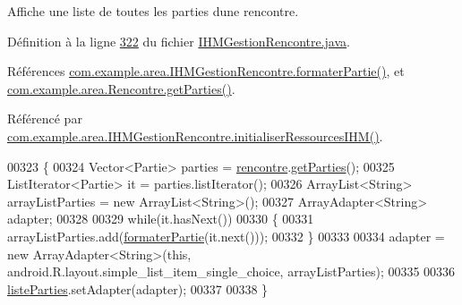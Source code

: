 Affiche une liste de toutes les parties d\textquotesingle{}une rencontre. 



Définition à la ligne \hyperlink{_i_h_m_gestion_rencontre_8java_source_l00322}{322} du fichier \hyperlink{_i_h_m_gestion_rencontre_8java_source}{I\+H\+M\+Gestion\+Rencontre.\+java}.



Références \hyperlink{_i_h_m_gestion_rencontre_8java_source_l00343}{com.\+example.\+area.\+I\+H\+M\+Gestion\+Rencontre.\+formater\+Partie()}, et \hyperlink{_rencontre_8java_source_l00158}{com.\+example.\+area.\+Rencontre.\+get\+Parties()}.



Référencé par \hyperlink{_i_h_m_gestion_rencontre_8java_source_l00142}{com.\+example.\+area.\+I\+H\+M\+Gestion\+Rencontre.\+initialiser\+Ressources\+I\+H\+M()}.


\begin{DoxyCode}
00323     \{
00324         Vector<Partie> parties = \hyperlink{classcom_1_1example_1_1area_1_1_i_h_m_gestion_rencontre_aa3ecacbd8ab104d2a3c3f3e727ae6c5c}{rencontre}.\hyperlink{classcom_1_1example_1_1area_1_1_rencontre_a58b62bd2f8a63f532df2bc8607268a2d}{getParties}();
00325         ListIterator<Partie> it = parties.listIterator();
00326         ArrayList<String> arrayListParties = \textcolor{keyword}{new} ArrayList<String>();
00327         ArrayAdapter<String> adapter;
00328 
00329         \textcolor{keywordflow}{while}(it.hasNext())
00330         \{
00331             arrayListParties.add(\hyperlink{classcom_1_1example_1_1area_1_1_i_h_m_gestion_rencontre_aadc556a63bb77b707f4677c34d61dae5}{formaterPartie}(it.next()));
00332         \}
00333 
00334         adapter = \textcolor{keyword}{new} ArrayAdapter<String>(\textcolor{keyword}{this}, android.R.layout.simple\_list\_item\_single\_choice, 
      arrayListParties);
00335 
00336         \hyperlink{classcom_1_1example_1_1area_1_1_i_h_m_gestion_rencontre_a127e07e7de6ff7e02fa84c52a3399aaa}{listeParties}.setAdapter(adapter);
00337 
00338     \}
\end{DoxyCode}
\mbox{\label{classcom_1_1example_1_1area_1_1_i_h_m_gestion_rencontre_a3d4decb257b09dafa98f4a6accc8c15d}} 
